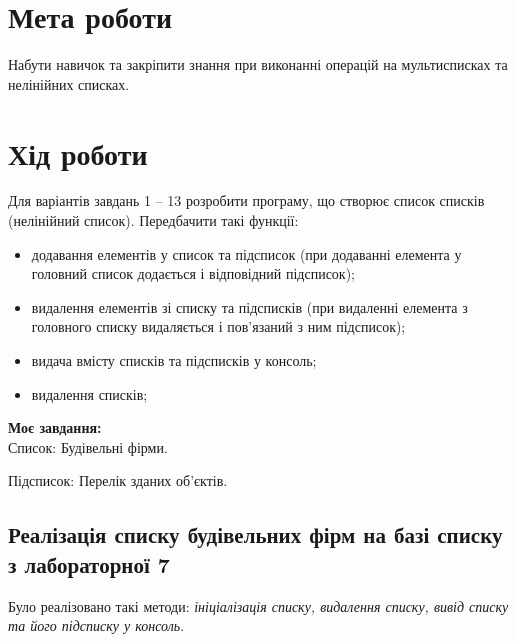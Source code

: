 \section{Мета роботи}
Набути навичок та закріпити знання при виконанні операцій на
мультисписках та нелінійних списках.

\section{Хід роботи}
Для варіантів завдань 1 – 13 розробити програму, що створює список
списків (нелінійний список). Передбачити такі функції:

\begin{itemize}
  \item додавання елементів у список та підсписок (при додаванні елемента
  у головний список додається і відповідний підсписок);
  \item видалення елементів зі списку та підсписків (при видаленні
  елемента з головного списку видаляється і пов’язаний з ним підсписок);
  \item видача вмісту списків та підсписків у консоль;
  \item видалення списків;
\end{itemize}

\textbf{Моє завдання:} \\

Список: Будівельні фірми. 

Підсписок: Перелік зданих об’єктів.

\clearpage
\subsection{Реалізація списку будівельних фірм на базі списку з лабораторної 7}
Було реалізовано такі методи: \textit{ініціалізація списку, видалення списку, вивід списку та його підсписку у консоль}.

